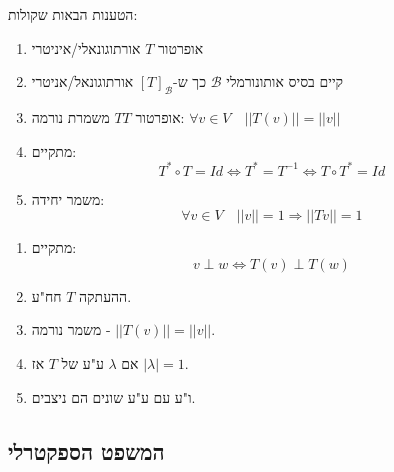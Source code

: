 \documentclass{tstextbook}
\begin{document}
\begin{proposition}
הטענות הבאות שקולות:

  \begin{enumerate}
    \item אופרטור \(T\) אורתוגונאלי/איניטרי 


    \item קיים בסיס אותונורמלי \(\mathcal{B}\) כך ש-\([T]_\mathcal{B}\) אורתוגונאל/אניטרי 


    \item אופרטור \(T\)\(T\) משמרת נורמה: \(\forall v\in V\quad ||T(v)||=||v||\)


    \item מתקיים: 
$$T^* \circ T = Id \iff T^* =T^{-1} \iff T\circ T^* = Id$$


    \item משמר יחידה: 
$$\forall v\in V\quad ||v||=1 \Rightarrow ||Tv||=1$$


  \end{enumerate}
\end{proposition}
\begin{proposition}
  \begin{enumerate}
    \item מתקיים: 
$$v\perp w \iff T(v)\perp T(w)$$


    \item ההעתקה \(T\) חח"ע. 


    \item משמר נורמה - \(||T(v)|| = ||v||\). 


    \item אם \(\lambda\) ע"ע של \(T\) אז \(|\lambda|=1\). 


    \item ו"ע עם ע"ע שונים הם ניצבים. 


  \end{enumerate}
\end{proposition}
\subsection{המשפט הספקטרלי}
\end{document}
